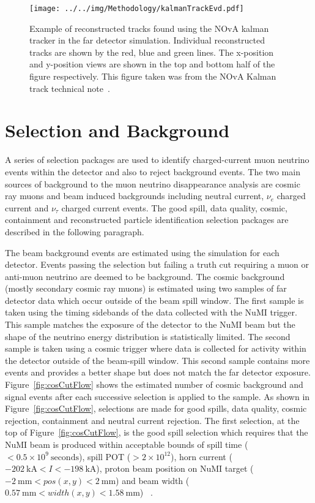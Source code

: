 \begin{figure}[h]
  \centering
  \texttt{[image: ../../img/Methodology/kalmanTrackEvd.pdf]} 
  \caption{Example of reconstructed tracks found using the NOvA kalman
    tracker in the far detector simulation. Individual reconstructed
    tracks are shown by the red, blue and green lines. The x-position
    and y-position views are shown in the top and bottom half of the
    figure respectively. This figure taken was from the NOvA Kalman
    track technical note~\cite{KalmanTrackNote}.   
  } 
  \label{fig:recoTrackEvd}
\end{figure}


\section{Selection and Background}\label{sec:sel}

A series of selection packages are used to identify charged-current
muon neutrino events within the detector and also to reject background
events. 
The two main sources of background to the muon neutrino
disappearance analysis are cosmic ray muons and beam induced
backgrounds including neutral current, $\nu_e$ charged current
and $\nu_\tau$ charged current events. 
The good spill, data quality, cosmic, containment and reconstructed
particle identification selection packages are described in the
following paragraph. 

The beam background events are estimated using the simulation for each
detector.
Events passing the selection but failing a truth cut
requiring a muon or anti-muon neutrino are deemed to be
background. 
The cosmic background (mostly secondary cosmic ray muons) is estimated
using two samples of far detector data which occur outside of the beam
spill window.  
The first sample is taken using the timing sidebands of the data
collected with the NuMI trigger. This sample matches the exposure of the
detector to the NuMI beam but the shape of the neutrino energy
distribution is statistically limited.
The second sample is taken using a cosmic trigger where data is
collected for activity within the detector outside of the beam-spill window.
This second sample contains more events and provides a better shape
but does not match the far detector exposure.
Figure~\ref{fig:cosCutFlow} shows the estimated number of cosmic
background and signal events after each successive selection is
applied to the sample.
As shown in Figure~\ref{fig:cosCutFlow}, selections are made for good
spills, data quality, cosmic rejection, containment and neutral
current rejection. 
The first selection, at the top of Figure~\ref{fig:cosCutFlow}, is the
good spill selection which requires that the
NuMI beam is produced within acceptable bounds of spill time ($< 0.5
\times 10^9~\text{seconds}$), 
spill POT ($> 2 \times 10^{12}$), 
horn current ($-202~\text{kA} < I < -198~\text{kA}$), proton beam
position on NuMI target ($-2~\text{mm} < pos(x,y) < 2~\text{mm}$) and
beam width ($0.57~\text{mm} < width(x,y) <1.58~\text{mm}$)
\cite{NOvASADAQ}~\cite{NOvAFABeamMon}. 


